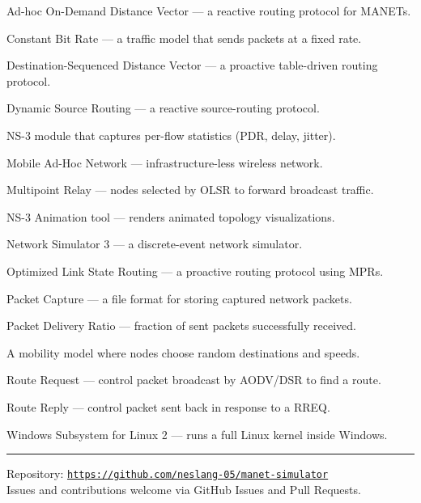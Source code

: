 \documentclass[12pt,a4paper]{article}
\begin{document}
\begin{description}[leftmargin=3em, style=nextline]
  \item[\textbf{AODV}] Ad-hoc On-Demand Distance Vector — a reactive routing protocol for MANETs.
  \item[\textbf{CBR}] Constant Bit Rate — a traffic model that sends packets at a fixed rate.
  \item[\textbf{DSDV}] Destination-Sequenced Distance Vector — a proactive table-driven routing protocol.
  \item[\textbf{DSR}] Dynamic Source Routing — a reactive source-routing protocol.
  \item[\textbf{FlowMonitor}] NS-3 module that captures per-flow statistics (PDR, delay, jitter).
  \item[\textbf{MANET}] Mobile Ad-Hoc Network — infrastructure-less wireless network.
  \item[\textbf{MPR}] Multipoint Relay — nodes selected by OLSR to forward broadcast traffic.
  \item[\textbf{NetAnim}] NS-3 Animation tool — renders animated topology visualizations.
  \item[\textbf{NS-3}] Network Simulator 3 — a discrete-event network simulator.
  \item[\textbf{OLSR}] Optimized Link State Routing — a proactive routing protocol using MPRs.
  \item[\textbf{PCAP}] Packet Capture — a file format for storing captured network packets.
  \item[\textbf{PDR}] Packet Delivery Ratio — fraction of sent packets successfully received.
  \item[\textbf{Random Waypoint}] A mobility model where nodes choose random destinations and speeds.
  \item[\textbf{RREQ}] Route Request — control packet broadcast by AODV/DSR to find a route.
  \item[\textbf{RREP}] Route Reply — control packet sent back in response to a RREQ.
  \item[\textbf{WSL2}] Windows Subsystem for Linux 2 — runs a full Linux kernel inside Windows.
\end{description}

\bigskip
\hrule
\bigskip
\begin{center}
  {\small Repository: \href{https://github.com/neslang-05/manet-simulator}{\texttt{https://github.com/neslang-05/manet-simulator}}}\\[0.3em]
  {\small Issues and contributions welcome via GitHub Issues and Pull Requests.}
\end{center}

\end{document}
